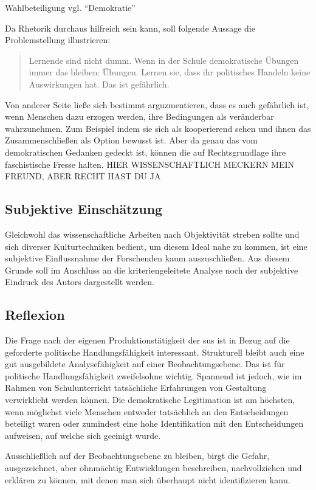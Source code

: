 
Wahlbeteiligung vgl. \enquote{Demokratie}

Da Rhetorik durchaus hilfreich sein kann, soll folgende Aussage die Problemstellung illustrieren:
\begin{quote}
    Lernende sind nicht dumm. Wenn in der Schule demokratische Übungen immer das bleiben: Übungen. Lernen sie, dass ihr politisches Handeln keine Auswirkungen hat. Das ist gefährlich.
\end{quote}

Von anderer Seite ließe sich bestimmt arguzmentieren, dass es auch gefährlich ist, wenn Menschen dazu erzogen werden, ihre Bedingungen als veränderbar wahrzunehmen. Zum Beispiel indem sie sich als kooperierend sehen und ihnen das Zusammenschließen als Option bewusst ist.
Aber da genau das vom demokratischen Gedanken gedeckt ist, können die auf Rechtsgrundlage ihre faschistische Fresse halten. HIER WISSENSCHAFTLICH MECKERN MEIN FREUND, ABER RECHT HAST DU JA


\subsection{Subjektive Einschätzung}
Gleichwohl das wissenschaftliche Arbeiten nach Objektivität streben sollte und sich diverser Kulturtechniken bedient, um diesem Ideal nahe zu kommen, ist eine subjektive Einflussnahme der Forschenden kaum auszuschließen. Aus diesem Grunde soll im Anschluss an %
die kriteriengeleitete Analyse noch der subjektive Eindruck des Autors dargestellt werden. 

\subsection{Reflexion}
Die Frage nach der eigenen Produktionstätigkeit der \gls{sus} ist in Bezug auf die geforderte politische Handlungsfähigkeit interessant. Strukturell bleibt auch eine gut ausgebildete Analysefähigkeit auf einer Beobachtungsebene. Das ist für politische Handlungsfähigkeit zweifelsohne wichtig. Spannend ist jedoch, wie im Rahmen von Schulunterricht tatsächliche Erfahrungen von Gestaltung verwirklicht werden können. Die demokratische Legitimation ist am höchsten, wenn möglichst viele Menschen entweder tatsächlich an den Entscheidungen beteiligt waren oder zumindest eine hohe Identifikation mit den Entscheidungen aufweisen, auf welche sich geeinigt wurde. 

Ausschließlich auf der Beobachtungsebene zu bleiben, birgt die Gefahr, ausgezeichnet, aber ohnmächtig Entwicklungen beschreiben, nachvollziehen und erklären zu können, mit denen man sich überhaupt nicht identifizieren kann. 

